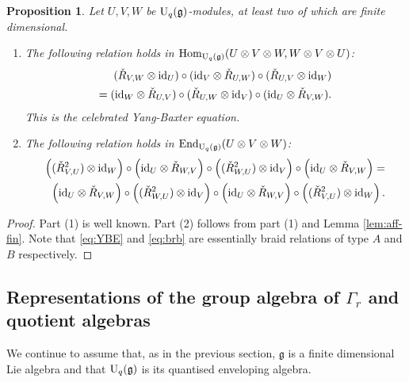 \documentclass[12pt]{amsart}
\newtheorem{proposition}[theorem]{Proposition}
\theoremstyle{definition}
\theoremstyle{remark}
\numberwithin{equation}{section}
\newcommand{\id}{{\rm{id}}}
\newcommand{\mf}{\mathfrak}
\newcommand{\fg}{{\mf g}}
\newcommand{\be}{\begin{equation}}
\newcommand{\ee}{\end{equation}}
\newcommand{\U}{{\rm{U}}}
\newcommand{\End}{{\rm{End}}}
\newcommand{\Hom}{{\rm{Hom}}}
\newcommand{\ot}{\otimes}
\begin{document}
\begin{proposition}\label{prop:braid}
Let $U, V, W$ be $\U_q(\fg)$-modules, at least two of which are finite dimensional. 
\begin{enumerate}
\item
The following relation holds in $\Hom_{\U_q(\fg)}(U\otimes V\otimes W,  W\otimes V\otimes U)$:
\begin{eqnarray}\label{eq:YBE}
\begin{aligned}
(\check{R}_{V, W}\otimes\id_U)\circ(\id_V\otimes \check{R}_{U, W})\circ (\check{R}_{U, V}\otimes\id_W)
\\
=(\id_W\otimes \check{R}_{U, V})\circ(\check{R}_{U, W}\otimes\id_V)\circ(\id_U\otimes \check{R}_{V, W}).
\end{aligned}
\end{eqnarray}
This is the celebrated Yang-Baxter equation. 

\item
The following relation holds in $\End_{\U_q(\fg)}(U\ot V\ot W)$:
\be\label{eq:brb}
\begin{aligned}
\left((\check R_{V,U}^2)\ot\id_W\right)\circ \left(\id_U\ot\check R_{W,V}\right)\circ \left((\check R_{W,U}^2)\ot\id_V\right)
\circ\left(\id_U\ot\check R_{V,W}\right)=&\\
\left(\id_U\ot\check R_{V,W}\right)\circ\left((\check R_{W,U}^2)\ot\id_V\right)\circ
 \left(\id_U\ot\check R_{W,V}\right)\circ \left((\check R_{V,U}^2)\ot\id_W\right).&
\end{aligned}
\ee
\end{enumerate}
\end{proposition}\begin{proof}
Part (1) is well known. Part (2) follows from part (1) and Lemma \ref{lem:aff-fin}. Note that \eqref{eq:YBE} and \eqref{eq:brb} are
essentially braid relations of type $A$ and $B$ respectively.
\end{proof}

%
%
\subsection{Representations of the group algebra of $\Gamma_r$ and quotient algebras}
%
%
We continue to assume that, as in the previous section,  $\fg$ is a finite dimensional Lie algebra and that $\U_q(\fg)$
is its quantised enveloping algebra. 
\end{document}
